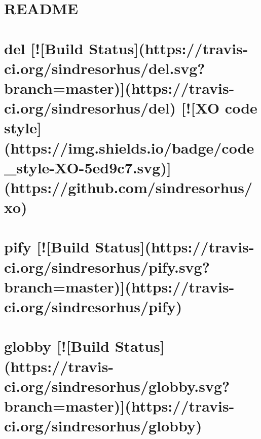 \documentclass[twoside]{book}
\newcommand{\+}{\discretionary{\mbox{\scriptsize$\hookleftarrow$}}{}{}}
\begin{document}
\chapter{R\+E\+A\+D\+ME}
\label{md__c_1_workspace_demo_src_main_script_node_modules_webpack-dev-middleware__r_e_a_d_m_e}

\chapter{del \mbox{[}!\mbox{[}Build Status\mbox{]}(https\+://travis-\/ci.org/sindresorhus/del.svg?branch=master)\mbox{]}(https\+://travis-\/ci.org/sindresorhus/del) \mbox{[}!\mbox{[}XO code style\mbox{]}(https\+://img.shields.\+io/badge/code\+\_\+style-\/\+X\+O-\/5ed9c7.svg)\mbox{]}(https\+://github.com/sindresorhus/xo)}
\label{md__c_1_workspace_demo_src_main_script_node_modules_webpack-dev-server_node_modules_del_readme}

\chapter{pify \mbox{[}!\mbox{[}Build Status\mbox{]}(https\+://travis-\/ci.org/sindresorhus/pify.svg?branch=master)\mbox{]}(https\+://travis-\/ci.org/sindresorhus/pify)}
\label{md__c_1_workspace_demo_src_main_script_node_modules_webpack-dev-server_node_modules_globby_node_modules_pify_readme}

\chapter{globby \mbox{[}!\mbox{[}Build Status\mbox{]}(https\+://travis-\/ci.org/sindresorhus/globby.svg?branch=master)\mbox{]}(https\+://travis-\/ci.org/sindresorhus/globby)}
\label{md__c_1_workspace_demo_src_main_script_node_modules_webpack-dev-server_node_modules_globby_readme}

\end{document}
